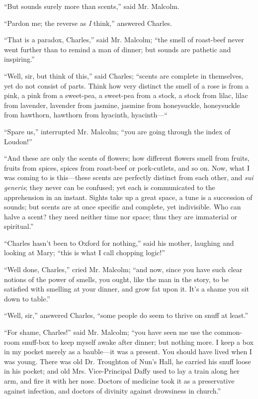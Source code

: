 ``But sounds surely more than scents,'' said Mr. Malcolm.

``Pardon me; the reverse as \emph{I} think,'' answered
Charles.

``That is a paradox, Charles,'' said Mr. Malcolm; ``the
smell of roast-beef never went further than to remind a man of dinner;
but sounds are pathetic and inspiring.''

``Well, sir, but think of this,'' said Charles;
``scents are complete in themselves, yet do not consist of parts.
Think how very distinct the smell of a rose is from a pink, a pink
from a sweet-pea, a sweet-pea from a stock, a stock from lilac, lilac
from lavender, lavender from jasmine, jasmine from honeysuckle,
honeysuckle from hawthorn, hawthorn from hyacinth, hyacinth—``

``Spare us,'' interrupted Mr. Malcolm; ``you are going
through the index of Loudon!''

``And these are only the scents of flowers; how different
flowers smell from fruits, fruits from spices, spices from roast-beef
or pork-cutlets, and so on. Now, what I was coming to is this—these
scents are perfectly distinct from each other, and \emph{sui generis};
they never can be confused; yet each is communicated to the
apprehension in an instant. Sights take up a great space, a tune is a
succession of sounds; but scents are at once specific and complete,
yet indivisible. Who can halve a scent? they need neither time nor
space; thus they are immaterial or spiritual.''

``Charles hasn't been to Oxford for nothing,'' said his
mother, laughing and looking at Mary; ``this is what I call
chopping logic!''

``Well done, Charles,'' cried Mr. Malcolm; ``and now,
since you have such clear notions of the power of smells, you ought,
like the man in the story, to be satisfied with smelling at your
dinner, and grow fat upon it. It's a shame you sit down to
table.''

``Well, sir,'' answered Charles, ``some people do seem
to thrive on snuff at least.''

``For shame, Charles!'' said Mr. Malcolm; ``you have
seen me use the common-room snuff-box to keep myself awake after
dinner; but nothing more. I keep a box in my pocket merely as a bauble—it
was a present. You should have lived when I was young. There was old
Dr. Troughton of Nun's Hall, he carried his snuff loose in his pocket;
and old Mrs. Vice-Principal Daffy used to lay a train along her arm,
and fire it with her nose. Doctors of medicine took it as a
preservative against infection, and doctors of divinity against
drowsiness in church.''

